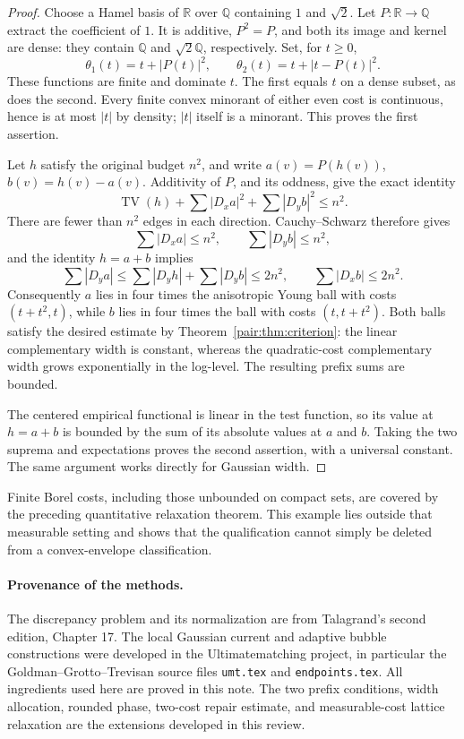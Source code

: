 \documentclass[11pt]{article}
\numberwithin{equation}{section}
\begin{document}
\begin{proof}
Choose a Hamel basis of $\mathbb R$ over $\mathbb Q$ containing
$1$ and $\sqrt2$. Let $P:\mathbb R\to\mathbb Q$ extract the
coefficient of $1$. It is additive, $P^2=P$, and both its image
and kernel are dense: they contain $\mathbb Q$ and
$\sqrt2\mathbb Q$, respectively. Set, for $t\ge0$,
\[
 \theta_1(t)=t+|P(t)|^2,\qquad
 \theta_2(t)=t+|t-P(t)|^2.
\]
These functions are finite and dominate $t$. The first equals $t$
on a dense subset, as does the second. Every finite convex minorant
of either even cost is continuous, hence is at most $|t|$ by density;
$|t|$ itself is a minorant. This proves the first assertion.

Let $h$ satisfy the original budget $n^2$, and write
$a(v)=P(h(v))$, $b(v)=h(v)-a(v)$. Additivity of $P$, and its oddness,
give the exact identity
\[
 \operatorname{TV}(h)
   +\sum|D_xa|^2+\sum|D_yb|^2\le n^2.
\]
There are fewer than $n^2$ edges in each direction. Cauchy--Schwarz
therefore gives
\[
 \sum|D_xa|\le n^2,\qquad \sum|D_yb|\le n^2,
\]
and the identity $h=a+b$ implies
\[
 \sum|D_ya|\le\sum|D_yh|+\sum|D_yb|\le2n^2,
 \qquad
 \sum|D_xb|\le2n^2.
\]
Consequently $a$ lies in four times the anisotropic Young ball with
costs $(t+t^2,t)$, while $b$ lies in four times the ball with costs
$(t,t+t^2)$. Both balls satisfy the desired estimate by
Theorem~\ref{pair:thm:criterion}: the linear complementary width is
constant, whereas the quadratic-cost complementary width grows
exponentially in the log-level. The resulting prefix sums are bounded.

The centered empirical functional is linear in the test function,
so its value at $h=a+b$ is bounded by the sum of its absolute values
at $a$ and $b$. Taking the two suprema and expectations proves the
second assertion, with a universal constant. The same argument
works directly for Gaussian width.
\end{proof}

Finite Borel costs, including those unbounded on compact sets, are
covered by the preceding quantitative relaxation theorem. This example
lies outside that measurable setting and shows that the qualification
cannot simply be deleted from a convex-envelope classification.



\paragraph{Provenance of the methods.}
The discrepancy problem and its normalization are from Talagrand's
second edition, Chapter 17. The local Gaussian current and adaptive
bubble constructions were developed in the Ultimatematching project,
in particular the Goldman--Grotto--Trevisan source files
\texttt{umt.tex} and \texttt{endpoints.tex}. All ingredients used here
are proved in this note. The two prefix conditions, width allocation,
rounded phase, two-cost repair estimate, and measurable-cost lattice
relaxation are the extensions developed in this review.
\end{document}
